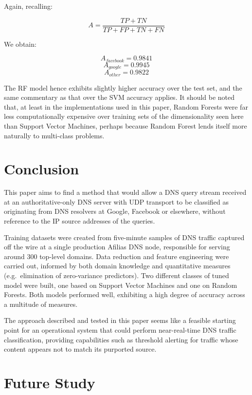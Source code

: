 \documentclass[conference]{IEEEtran}
\begin{document}
Again, recalling:

\[A = \frac{TP + TN}{TP + FP + TN + FN}\]

We obtain:

\[A_{facebook} = 0.9841\] \[A_{google} = 0.9945\]
\[A_{other} = 0.9822 \]

The RF model hence exhibits slightly higher accuracy over the test set,
and the same commentary as that over the SVM accuracy applies. It should
be noted that, at least in the implementations used in this paper,
Random Forests were far less computationally expensive over training
sets of the dimensionality seen here than Support Vector Machines,
perhaps because Random Forest lends itself more naturally to multi-class
problems.

\section{Conclusion}\label{sec:conclusion}

\label{sec:conclusion}

This paper aims to find a method that would allow a DNS query stream
received at an authoritative-only DNS server with UDP transport to be
classified as originating from DNS resolvers at Google, Facebook or
elsewhere, without reference to the IP source addresses of the queries.

Training datasets were created from five-minute samples of DNS traffic
captured off the wire at a single production Afilias DNS node,
responsible for serving around 300 top-level domains. Data reduction and
feature engineering were carried out, informed by both domain knowledge
and quantitative measures (e.g.~elimination of zero-variance
predictors). Two different classes of tuned model were built, one based
on Support Vector Machines and one on Random Forests. Both models
performed well, exhibiting a high degree of accuracy across a multitude
of measures.

The approach described and tested in this paper seems like a feasible
starting point for an operational system that could perform
near-real-time DNS traffic classification, providing capabilities such
as threshold alerting for traffic whose content appears not to match its
purported source.

\section{Future Study}\label{sec:future-study}

\label{sec:future}
\end{document}
